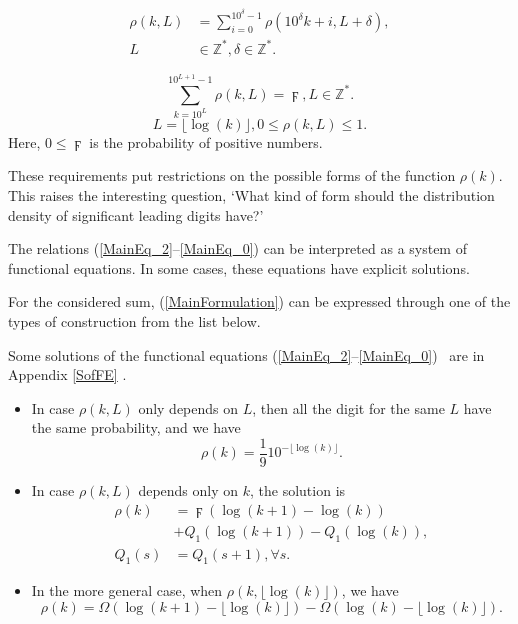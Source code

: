 \documentclass[titlepage,fleqn]{article}%
\providecommand{\U}[1]{\protect\rule{.1in}{.1in}}
\begin{document}
\begin{align}
\rho(k,L) &  =%
{\displaystyle\sum\limits_{i=0}^{10^{\delta}-1}}
\rho(10^{\delta}k+i,L+\delta),\label{MainEq_2}\\
L &  \in%
\mathbb{Z}
^{\ast},\delta\in%
\mathbb{Z}
^{\ast}.\nonumber
\end{align}
%

\begin{equation}%
{\displaystyle\sum\limits_{k=10^{L}}^{10^{L+1}-1}}
\rho(k,L)=\digamma,L\in%
\mathbb{Z}
^{\ast}.\label{MainEq_0}%
\end{equation}%
\[
L=\lfloor\log(k)\rfloor,0\leq\rho(k,L)\leq1.
\]
\noindent Here, $0\leq\digamma$ is the probability of positive numbers.

These requirements put restrictions on the possible forms of the function
$\rho(k)$. This raises the interesting question, `What kind of form should the
distribution density of significant leading digits have?'

The relations (\ref{MainEq_2}--\ref{MainEq_0}) can be interpreted as a system
of functional equations. In some cases, these equations have explicit solutions.

For the considered sum, (\ref{MainFormulation}) can be expressed through one
of the types of construction from the list below.

Some solutions of the functional equations (\ref{MainEq_2}--\ref{MainEq_0})
\ are in Appendix
\ref{SofFE}%
.

\begin{itemize}
\item In case $\rho(k,L)$ only depends on $L$, then all the digit for the same
$L$ have the same probability, and we have%
\begin{equation}
\rho(k)=\frac{1}{9}10^{-\lfloor\log(k)\rfloor}. \label{S1}%
\end{equation}


\item In case $\rho(k,L)$ depends only on $k$, the solution is%
\begin{align}
\rho(k)  &  =\digamma\left(  \log(k+1)-\log(k)\right) \label{S2}\\
&  +Q_{1}(\log(k+1))-Q_{1}(\log(k)),\nonumber\\
Q_{1}(s)  &  =Q_{1}(s+1),\forall s.\nonumber
\end{align}


\item In the more general case, when $\rho(k,\lfloor\log(k)\rfloor)$, we have%
\begin{equation}
\rho(k)=\Omega(\log(k+1)-\lfloor\log(k)\rfloor)-\Omega(\log(k)-\lfloor
\log(k)\rfloor). \label{S3}%
\end{equation}

\end{itemize}
\end{document}
